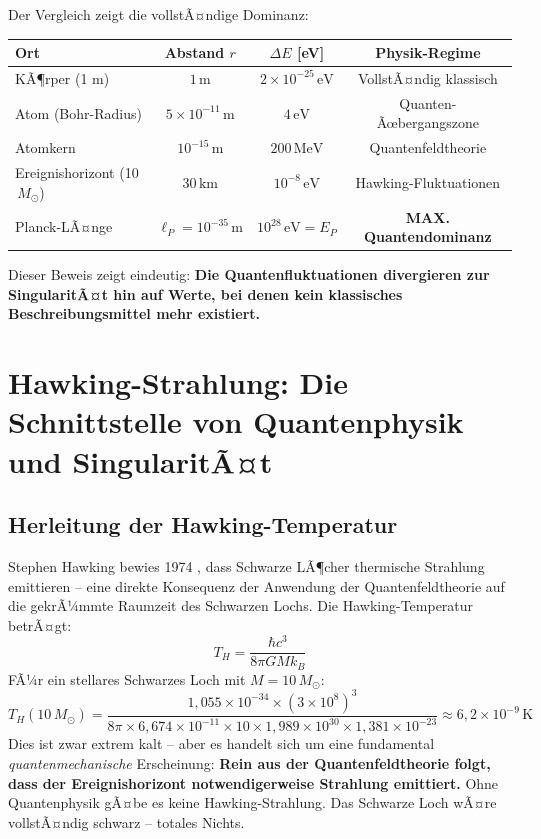 ﻿\documentclass[12pt,a4paper]{report}
\begin{document}
Der Vergleich zeigt die vollstÃ¤ndige Dominanz:

\begin{center}
\begin{tabular}{lccc}
    \hline
    \textbf{Ort} & \textbf{Abstand $r$} & \textbf{$\Delta E$ [eV]} & \textbf{Physik-Regime} \\
    \hline
    KÃ¶rper (1 m) & $1\,\text{m}$ & $2 \times 10^{-25}\,\text{eV}$ & VollstÃ¤ndig klassisch \\
    Atom (Bohr-Radius) & $5 \times 10^{-11}\,\text{m}$ & $4\,\text{eV}$ & Quanten-Ãœbergangszone \\
    Atomkern & $10^{-15}\,\text{m}$ & $200\,\text{MeV}$ & Quantenfeldtheorie \\
    Ereignishorizont (10$\,M_\odot$) & $30\,\text{km}$ & $10^{-8}\,\text{eV}$ & Hawking-Fluktuationen \\
    Planck-LÃ¤nge & $\ell_P = 10^{-35}\,\text{m}$ & $10^{28}\,\text{eV} = E_P$ & \textbf{MAX. Quantendominanz} \\
    \hline
\end{tabular}
\end{center}

Dieser Beweis zeigt eindeutig: \textbf{Die Quantenfluktuationen divergieren zur SingularitÃ¤t hin auf Werte, bei denen kein klassisches Beschreibungsmittel mehr existiert.}


\section{Hawking-Strahlung: Die Schnittstelle von Quantenphysik und SingularitÃ¤t}

\subsection{Herleitung der Hawking-Temperatur}

Stephen Hawking bewies 1974 \cite{hawking1975}, dass Schwarze LÃ¶cher thermische Strahlung emittieren -- eine direkte Konsequenz der Anwendung der Quantenfeldtheorie auf die gekrÃ¼mmte Raumzeit des Schwarzen Lochs. Die Hawking-Temperatur betrÃ¤gt:
\begin{equation}
    T_H = \frac{\hbar c^3}{8\pi G M k_B}
    \label{eq:hawking_temperatur}
\end{equation}
FÃ¼r ein stellares Schwarzes Loch mit $M = 10\,M_\odot$:
\begin{equation}
    T_H(10\,M_\odot) = \frac{1{,}055 \times 10^{-34} \times (3 \times 10^8)^3}{8\pi \times 6{,}674 \times 10^{-11} \times 10 \times 1{,}989 \times 10^{30} \times 1{,}381 \times 10^{-23}} \approx 6{,}2 \times 10^{-9}\,\text{K}
    \label{eq:hawking_zahlenwert}
\end{equation}
Dies ist zwar extrem kalt -- aber es handelt sich um eine fundamental \emph{quantenmechanische} Erscheinung: \textbf{Rein aus der Quantenfeldtheorie folgt, dass der Ereignishorizont notwendigerweise Strahlung emittiert.} Ohne Quantenphysik gÃ¤be es keine Hawking-Strahlung. Das Schwarze Loch wÃ¤re vollstÃ¤ndig schwarz -- totales Nichts.
\end{document}
